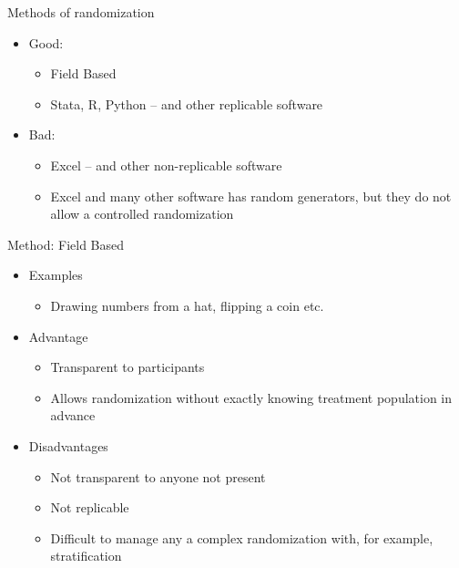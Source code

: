 \documentclass[aspectratio=169]{beamer}
\begin{document}
\begin{frame}{Methods of randomization}
\begin{itemize}
	\item Good:
		\begin{itemize}
			\item Field Based
			\item Stata, R, Python – and other replicable software
		\end{itemize}
	\item Bad:
		\begin{itemize}
			\item Excel – and other non-replicable software
			\item Excel and many other software has random generators, but they do not allow a controlled randomization
		\end{itemize}
\end{itemize}
\end{frame}

\begin{frame}{Method: Field Based}
\begin{itemize}
	\item Examples
		\begin{itemize}
			\item Drawing numbers from a hat, flipping a coin etc.
		\end{itemize}
	\item Advantage
		\begin{itemize}
			\item Transparent to participants
			\item Allows randomization without exactly knowing treatment population in advance
		\end{itemize}
	\item Disadvantages
		\begin{itemize}
			\item Not transparent to anyone not present
			\item Not replicable
			\item Difficult to manage any a complex randomization with, for example, stratification
		\end{itemize}
\end{itemize}
\end{frame}
\end{document}
